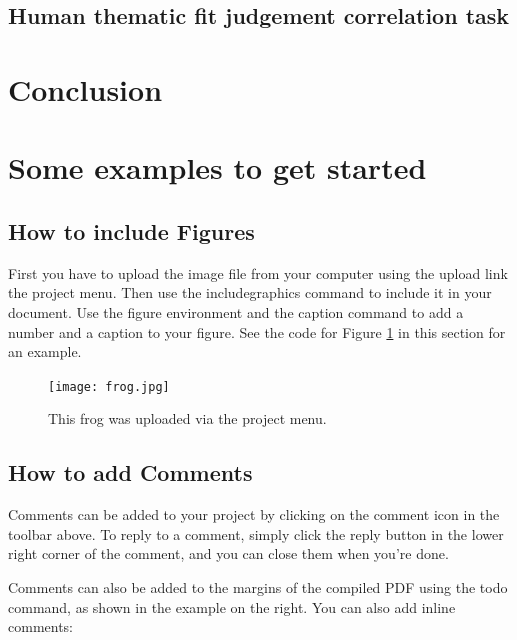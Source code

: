 \documentclass[a4paper]{article}
\begin{document}
\subsection{Human thematic fit judgement correlation task}







\section{Conclusion}





\newpage



\section{Some examples to get started}

\subsection{How to include Figures}

First you have to upload the image file from your computer using the upload link the project menu. Then use the includegraphics command to include it in your document. Use the figure environment and the caption command to add a number and a caption to your figure. See the code for Figure \ref{fig:frog} in this section for an example.

\begin{figure}
\centering
\texttt{[image: frog.jpg]}
\caption{\label{fig:frog}This frog was uploaded via the project menu.}
\end{figure}

\subsection{How to add Comments}

Comments can be added to your project by clicking on the comment icon in the toolbar above. %
%
%
To reply to a comment, simply click the reply button in the lower right corner of the comment, and you can close them when you're done.

Comments can also be added to the margins of the compiled PDF using the todo command, as shown in the example on the right. You can also add inline comments:
\end{document}
